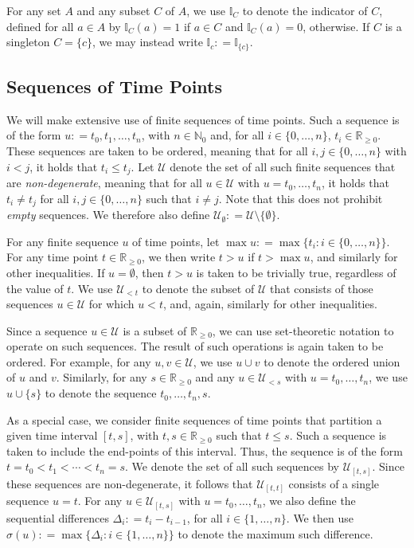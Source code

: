 \documentclass[10pt,a4paper]{paper}
\theoremstyle{definition}
\newcommand{\nats}{\mathbb{N}}
\newcommand{\natswith}{\nats_{0}}
\newcommand{\reals}{\mathbb{R}}
\newcommand{\realsnonneg}{\reals_{\geq 0}}
\newcommand{\ind}[1]{\mathbb{I}_{#1}}
\newcommand{\coloneqq}{:\!=}
\begin{document}
For any set $A$ and any subset $C$ of $A$, we use $\ind{C}$ to denote the indicator of $C$, defined for all $a\in A$ by $\ind{C}(a)=1$ if $a\in C$ and $\ind{C}(a)=0$, otherwise. If $C$ is a singleton $C=\{c\}$, we may instead write $\ind{c}\coloneqq\ind{\{c\}}$.

\subsection{Sequences of Time Points}\label{subsec:sequencesoftimepoints}

We will make extensive use of finite sequences of time points. Such a sequence is of the form $u\coloneqq t_0,t_1,\ldots,t_n$, with $n\in\natswith$ and, for all $i\in\{0,\ldots,n\}$, $t_i\in\realsnonneg$. These sequences are taken to be ordered, meaning that for all $i,j\in\{0,\ldots,n\}$ with $i<j$, it holds that $t_i\leq t_j$. Let $\mathcal{U}$ denote the set of all such finite sequences that are \emph{non-degenerate}, meaning that for all $u\in\mathcal{U}$ with $u=t_0,\ldots,t_n$, it holds that $t_i\neq t_j$ for all $i,j\in\{0,\ldots,n\}$ such that $i\neq j$. Note that this does not prohibit \emph{empty} sequences. We therefore also define $\mathcal{U}_\emptyset\coloneqq \mathcal{U}\setminus\{\emptyset\}$.

For any finite sequence $u$ of time points, let $\max u\coloneqq \max\{t_i:i\in\{0,\ldots,n\}\}$. For any time point $t\in\realsnonneg$, we then write $t>u$ if $t>\max u$, and similarly for other inequalities. If $u=\emptyset$, then $t>u$ is taken to be trivially true, regardless of the value of $t$. We use $\mathcal{U}_{<t}$ to denote the subset of $\mathcal{U}$ that consists of those sequences $u\in\mathcal{U}$ for which $u<t$, and, again, similarly for other inequalities.

Since a sequence $u\in\mathcal{U}$ is a subset of $\realsnonneg$, we can use set-theoretic notation to operate on such sequences. The result of such operations is again taken to be ordered. For example, for any $u,v\in\mathcal{U}$, we use $u\cup v$ to denote the ordered union of $u$ and $v$. Similarly, for any $s\in\realsnonneg$ and any $u\in\mathcal{U}_{<s}$ with $u=t_0,\ldots,t_n$, we use $u\cup\{s\}$ to denote the sequence $t_0,\ldots,t_n,s$.

As a special case, we consider finite sequences of time points that partition a given time interval $[t,s]$, with $t,s\in\realsnonneg$ such that $t\leq s$. Such a sequence is taken to include the end-points of this interval.  Thus, the sequence is of the form $t=t_0< t_1<\cdots< t_n=s$. We denote the set of all such sequences by $\mathcal{U}_{[t,s]}$. Since these sequences are non-degenerate, it follows that $\mathcal{U}_{[t,t]}$ consists of a single sequence $u=t$. For any $u\in\mathcal{U}_{[t,s]}$ with $u=t_0,\ldots,t_n$, we also define the sequential differences $\Delta_i\coloneqq t_i-t_{i-1}$, for all $i\in\{1,\ldots,n\}$. We then use $\sigma(u)\coloneqq \max\{\Delta_i:i\in\{1,\ldots,n\}\}$ to denote the maximum such difference.
\end{document}
